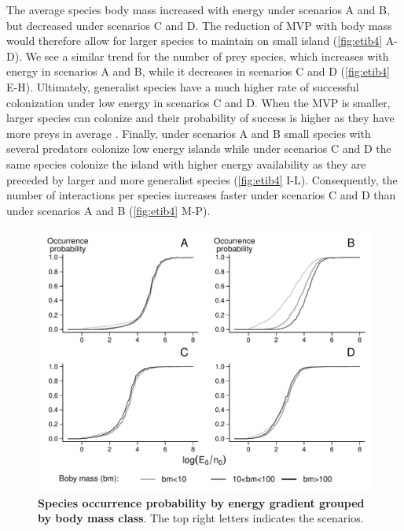 The average species body mass increased with energy under scenarios A
and B, but decreased under scenarios C and D. The reduction of MVP with
body mass would therefore allow for larger species to maintain on small
island (\ref{fig:etib4} A-D). We see a similar trend for the number of
prey species, which increases with energy in scenarios A and B, while it
decreases in scenarios C and D (\ref{fig:etib4} E-H). Ultimately,
generalist species have a much higher rate of successful colonization
under low energy in scenarios C and D. When the MVP is smaller, larger
species can colonize and their probability of success is higher as they
have more preys in average \citep[due to the use of the niche model and
body mass as the niche axis][]{Williams2000, Gravel2013}. Finally, under
scenarios A and B small species with several predators colonize low
energy islands while under scenarios C and D the same species colonize
the island with higher energy availability as they are preceded by
larger and more generalist species (\ref{fig:etib4} I-L). Consequently,
the number of interactions per species increases faster under scenarios
C and D than under scenarios A and B (\ref{fig:etib4} M-P).

\begin{figure}[htbp]
\centering
\includegraphics[width=\textwidth]{chapitre4/fig/fig3.pdf}
\caption[Species occurrence probability by energy gradient
grouped by body mass class]{\textbf{Species occurrence probability by energy gradient
grouped by body mass class}. The top right letters indicates the
scenarios.\label{fig:etib3}}
\end{figure}

